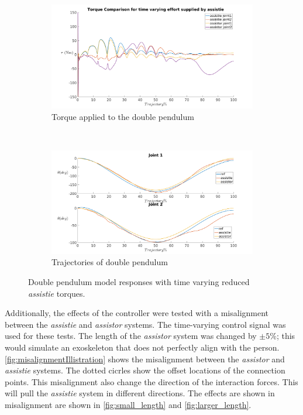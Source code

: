 \begin{figure}[h]
    \centering
    \begin{subfigure}{0.5\textwidth}
        \centering
        \includegraphics[width=\linewidth]{images/controllers/time_varying_torque.png}
        \caption[Double Pendulum: Time varying Torque-Effort]{Torque applied to the double pendulum}
        \label{fig:time_varying_torque}
    \end{subfigure}%
    ~
    \begin{subfigure}{0.5\textwidth}
        \centering
        \includegraphics[width=\linewidth]{images/controllers/time_varying_traj.png}
        \caption[Double Pendulum: Time Varying Effort-Trajectory]{Trajectories of double pendulum}
        \label{fig:time_varying_traj}
    \end{subfigure}
    \caption[Double Pendulum: Time Varying Torque]{Double pendulum model responses with time varying reduced \textit{ assistie} torques.}
    \label{fig:time_varying}
\end{figure}


Additionally, the effects of the controller were tested with a misalignment between the \textit{assistie} and \textit{assistor} systems. The time-varying control signal was used for these tests. The length of the \textit{assistor} system was changed by $\pm 5\%$; this would simulate an exoskeleton that does not perfectly align with the person. \autoref{fig:misalignmentIllistration} shows the misalignment between  the \textit{assistor} and \textit{assistie} systems. The dotted cicrles show the offset locations of the connection points. This misalignment also change the direction of the interaction forces. This will pull the \textit{assistie} system in different directions. The effects are shown in misalignment are shown in \autoref{fig:small_length} and \autoref{fig:larger_length}.



